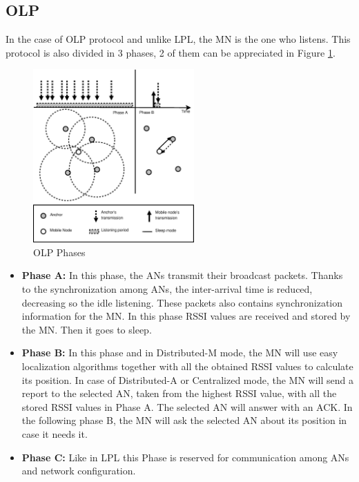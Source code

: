 \subsection{\acl{OLP}}

In the case of \ac{OLP} protocol and unlike \ac{LPL}, the \ac{MN} is the one who listens. This protocol is also divided in 3 phases, 2 of 
them can be appreciated in Figure \ref{fig:OLP}.

\begin{figure}[ht]
 \begin{center}
  \includegraphics[width=0.55\textwidth]{OLP.eps}
 \end{center}
 \caption{OLP Phases \cite{LPLandOLP}}
 \label{fig:OLP}
\end{figure}

\begin{itemize}
 \item \textbf{Phase A:} In this phase, the \acp{AN} transmit their broadcast packets. Thanks to the synchronization among \acp{AN}, the inter-arrival 
time is reduced, decreasing so the idle listening. These packets also contains synchronization information for the \ac{MN}. In this phase \ac{RSSI} values are received and stored
by the \ac{MN}. Then it goes to sleep.
 \item \textbf{Phase B:} In this phase and in Distributed-M mode, the \ac{MN} will use easy localization algorithms together with all the obtained
\ac{RSSI} values to calculate its position. In case of Distributed-A or Centralized mode, the \ac{MN} will send a report to the selected \ac{AN}, taken 
from the highest \ac{RSSI} value, with all the stored \ac{RSSI} values in Phase A. The selected \ac{AN} will answer with an \ac{ACK}. In the following
phase B, the \ac{MN} will ask the selected \ac{AN} about its position in case it needs it.
 \item \textbf{Phase C:} Like in \ac{LPL} this Phase is reserved for communication among \acp{AN} and network configuration.
\end{itemize}

